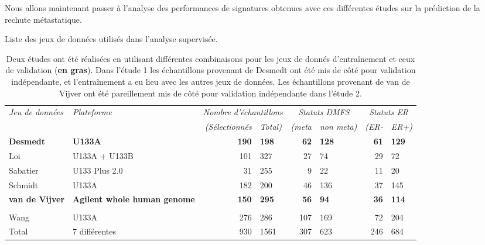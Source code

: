 		Nous allons maintenant passer à l'analyse des performances de signatures obtenues avec ces différentes études sur la prédiction de la rechute métastatique.

		\begin{table}
				\begin{center}
					\caption{Liste des jeux de données utilisés dans l'analyse supervisée.}
					\begin{tabular}{llr@{/}lr@{/}lr@{/}l}
						\toprule
						\emph{Jeu de données} & \emph{Plateforme} & \multicolumn{2}{c}{\emph{Nombre d'échantillons}} & \multicolumn{2}{c}{\emph{Statuts DMFS}} & \multicolumn{2}{c}{\emph{Statuts ER}} \\
						\cmidrule(r){3-8}
						&  & \emph{(Sélectionnés} & \emph{Total)}           & \emph{(meta} & \emph{non meta)} & \emph{(ER-}     & \emph{ER+)} \\
						\midrule
						\textbf{Desmedt}          & \textbf{U133A}          & \textbf{190} & \textbf{198} & \textbf{62} & \textbf{128} & \textbf{61} & \textbf{129} \\
						Loi                       & U133A + U133B           & 101 & 327                   & 27 & 74                & 29 & 72            \\
						Sabatier                  & U133 Plus 2.0           & 31 & 255                    & 9 & 22                 & 11 & 20            \\
						Schmidt                   & U133A                   & 182 & 200                   & 46 & 136               & 37 & 145           \\
						\textbf{van de Vijver}    & \multirow{2}{2.49cm}{\textbf{Agilent whole human genome}}  & \textbf{150} & \textbf{295} & \textbf{56} & \textbf{94}  & \textbf{36} & \textbf{114} \\
						& \\
						Wang                      & U133A                   & 276 & 286                   & 107 & 169              & 72 & 204           \\
						\midrule
						Total                     & 7 différentes           & 930 & 1561                  & 307 & 623              & 246 & 684          \\
						\bottomrule
					\end{tabular}\label{tab:Res2Data}
					\vspace{5ex}
					\caption*{Deux études ont été réalisées en utilisant différentes combinaisons pour les jeux de donnés d'entraînement et ceux de validation (\textbf{en gras}). Dans l'étude 1 les échantillons provenant de Desmedt ont été mis de côté pour validation indépendante, et l'entraînement a eu lieu avec les autres jeux de données. Les échantillons provenant de van de Vijver ont été pareillement mis de côté pour validation indépendante dans l'étude 2.}
				\end{center}
			\end{table}
